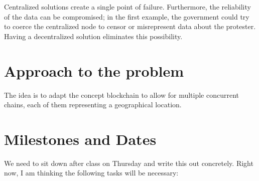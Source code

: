 \documentclass{article}
\begin{document}
Centralized solutions create a single point of failure.
Furthermore,
the reliability of the data can be compromised;
in the first example,
the government could try to coerce the centralized node
to censor or misrepresent data about the protester.
Having a decentralized solution eliminates this possibility.


\section*{Approach to the problem}

The idea is to adapt the concept blockchain to allow for multiple concurrent chains,
each of them representing a geographical location.


\section*{Milestones and Dates}
We need to sit down after class on Thursday and write this out concretely. Right now, I am thinking the following tasks will be necessary:
\end{document}
